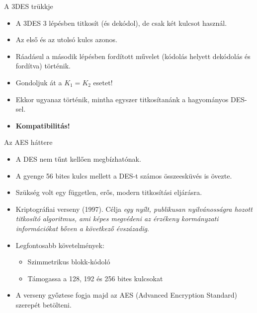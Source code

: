 \documentclass[12 pt]{beamer}
\begin{document}
\begin{frame}{A 3DES trükkje}
  \begin{itemize}
    \item{A 3DES 3 lépésben titkosít (és dekódol), de csak két kulcsot használ.}
    \item{Az első és az utolsó kulcs azonos.}
    \item{Ráadásul a második lépésben fordított művelet (kódolás helyett dekódolás és fordítva) történik.}
    \item{Gondoljuk át a $K_1 = K_2$ esetet!}
    \item{Ekkor ugyanaz történik, mintha egyszer titkosítanánk a hagyományos DES-sel.}
    \item{\textbf{Kompatibilitás!}}
  \end{itemize}

\end{frame}


\begin{frame}{Az AES háttere}
  \begin{itemize}
    \item{A DES nem tűnt kellően megbízhatónak.}
    \item{A gyenge 56 bites kulcs mellett a DES-t számos összeesküvés is övezte.}
    \item{Szükség volt egy független, erős, modern titkosítási eljárásra.}
    \item{Kriptográfiai verseny (1997). Célja \emph{egy nyílt, publikusan nyilvánosságra hozott titkosító algoritmus, ami képes megvédeni az érzékeny kormányzati információkat bőven a következő évszázadig}.}
    \item{Legfontosabb követelmények:}
      \begin{itemize}
        \item{Szimmetrikus blokk-kódoló}
        \item{Támogassa a 128, 192 és 256 bites kulcsokat}
      \end{itemize}
    \item{A verseny győztese fogja majd az AES (Advanced Encryption Standard) szerepét betölteni.}
  \end{itemize}
\end{frame}
\end{document}
